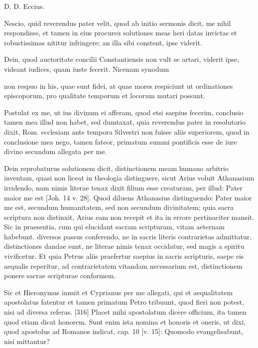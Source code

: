 D. D. Eccius.

Nescio, quid reverendus pater velit, quod ab initio sermonis dicit, me nihil respondisse, et tamen in eius procursu solutiones meas heri datas invictas et robustissimas nititur infringere; an illa sibi constent, ipse viderit.

Dein, quod auctoritate concilii Constantiensis non vult se artari, viderit ipse, videant iudices, quam iuste fecerit. Nicenam synodum

non respuo in his, quae sunt fidei, at quae mores respiciunt ut ordinationes episcoporum, pro qualitate temporum et locorum mutari possunt.

Postulat ex me, ut ius divinum ei afferam, quod etsi saepius fecerim, conclusio tamen mea illud non habet, sed dumtaxat, quia reverendus pater in resolutorio dixit, Rom. ecclesiam ante tempora Silvestri non fuisse aliis superiorem, quod in conclusione mea nego, tamen fateor, primatum summi pontificis esse de iure divino secundum allegata per me.

Dein reprobaturus solutionem dicit, distinctionem meam humano arbitrio inventam, quasi non liceat in theologia distinguere, sicut Arius voluit Athanasium irridendo, nam nimis literae tenax dixit filium esse creaturam, per illud: Pater maior me est [Joh. 14 v. 28]. Quod diluens Athanasius distinguendo: Pater maior me est, secundum humanitatem, sed non secundum divinitatem; quia sacra scriptura non distinxit, Arius eam non recepit et ita in errore pertinaciter mansit. Sic in praesentia, cum qui elucidant sacram scripturam, vitam aeternam habebunt. diversos passus conferendo, ne in sacris literis contrarietas admittatur, distinctiones dandae sunt, ne literae nimis tenax occidatur, sed magis a spiritu vivificetur. Et quia Petrus aliis praefertur saepius in sacris scripturis, saepe eis aequalis reperitur, ad contrarietatem vitandam necessarium est, distinctionem ponere sacrae scripturae conformem.

Sic et Hieronymus innuit et Cyprianus per me allegati, qui et aequalitatem apostolatus fatentur et tamen primatum Petro tribuunt, quod fieri non potest, nisi ad diversa referas. [316] Placet mihi apostolatum dicere officium, ita tamen quod etiam dicat honorem. Sunt enim ista nomina et honoris et oneris, ut dixi, quod apostolus ad Romanos indicat, cap. 10 [v. 15]: Quomodo evangelisabunt, nisi mittantur?

